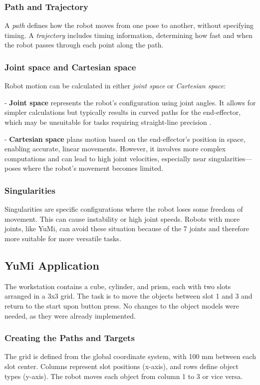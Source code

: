 \documentclass[a4paper,12pt]{article}
\begin{document}
\subsubsection{Path and Trajectory}
A \textit{path} defines how the robot moves from one pose to another, without specifying timing. A \textit{trajectory} includes timing information, determining how fast and when the robot passes through each point along the path.

\subsubsection{Joint space and Cartesian space}
Robot motion can be calculated in either \textit{joint space} or \textit{Cartesian space}:

- \textbf{Joint space} represents the robot's configuration using joint angles. It allows for simpler calculations but typically results in curved paths for the end-effector, which may be unsuitable for tasks requiring straight-line precision \parencite{corke2017}.

- \textbf{Cartesian space} plans motion based on the end-effector's position in space, enabling accurate, linear movements. However, it involves more complex computations and can lead to high joint velocities, especially near singularities—poses where the robot's movement becomes limited.

\subsubsection{Singularities}
Singularities are specific configurations where the robot loses some freedom of movement. This can cause instability or high joint speeds. Robots with more joints, like YuMi, can avoid these situation because of the 7 joints and therefore more suitable for more versatile tasks. 

\subsection{YuMi Application}
The workstation contains a cube, cylinder, and prism, each with two slots arranged in a 3x3 grid. The task is to move the objects between slot 1 and 3 and return to the start upon button press. No changes to the object models were needed, as they were already implemented.

\subsubsection{Creating the Paths and Targets}
The grid is defined from the global coordinate system, with 100 mm between each slot center. Columns represent slot positions (x-axis), and rows define object types (y-axis). The robot moves each object from column 1 to 3 or vice versa.
\end{document}
